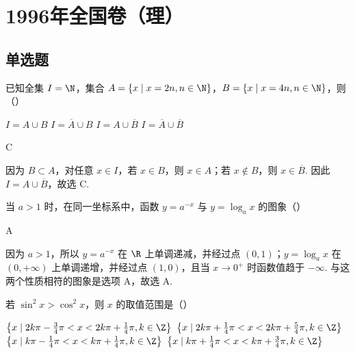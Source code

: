 \chapter{1996年全国卷（理）}
\section{单选题}

\begin{problem}
已知全集 \(I = \N\)，集合 \(A = \{x \mid x = 2n, n \in \N\}\)，\(B = \{x \mid x = 4n, n \in \N\}\)，则（\quad）

\choices
    {\(I = A\cup B\)}
    {\(I = \overline{A}\cup B\)}
    {\(I = A\cup \overline{B}\)}
    {\(I = \overline{A}\cup \overline{B}\)}
\end{problem}

\begin{answer}
C
\end{answer}

\begin{solution}
因为 \(B\subset A\)，对任意 \(x\in I\)，若 \(x\in B\)，则 \(x\in A\)；若 \(x\notin B\)，则 \(x\in\overline B\). 因此 \(I=A\cup\overline B\)，故选 C.
\end{solution}

\begin{problem}
当 \(a > 1\) 时，在同一坐标系中，函数 \(y = a^{-x}\) 与 \(y = \log_a x\) 的图象（\quad）

    {}
    {}
    {}
\end{problem}

\begin{answer}
A
\end{answer}

\begin{solution}
因为 \(a>1\)，所以 \(y=a^{-x}\) 在 \(\R\) 上单调递减，并经过点 \((0,1)\)；\(y=\log_a x\) 在 \((0,+\infty)\) 上单调递增，并经过点 \((1,0)\)，且当 \(x\to0^+\) 时函数值趋于 \(-\infty\). 与这两个性质相符的图象是选项 A，故选 A.
\end{solution}

\begin{problem}
若 \(\sin^2 x > \cos^2 x\)，则 \(x\) 的取值范围是（\quad）

\choices
    {\(\left\{x\mid 2k\pi -\frac{3}{4}\pi < x < 2k\pi +\frac{1}{4}\pi ,k\in \Z\right\}\)}
    {\(\left\{x\mid 2k\pi +\frac{1}{4}\pi < x < 2k\pi +\frac{5}{4}\pi ,k\in \Z\right\}\)}
    {\(\left\{x\mid k\pi -\frac{1}{4}\pi < x < k\pi + \frac{1}{4}\pi ,k\in \Z\right\}\)}
    {\(\left\{x\mid k\pi +\frac{1}{4}\pi < x < k\pi + \frac{3}{4}\pi ,k\in \Z\right\}\)}
\end{problem}

